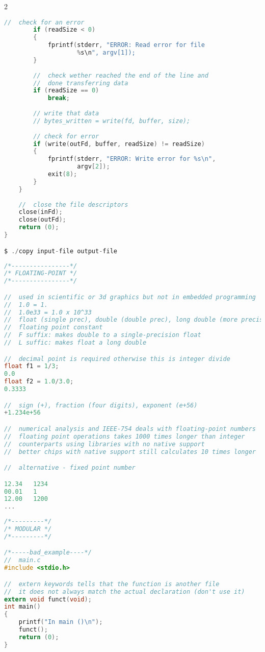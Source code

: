 \documentclass[8pt]{extarticle}
\begin{document}
\begin{small}
\begin{multicols}{2}
\begin{lstlisting}[language=C]
		//  check for an error
		if (readSize < 0)
		{
			fprintf(stderr, "ERROR: Read error for file 
					%s\n", argv[1]);
		}
		
		//  check wether reached the end of the line and
		//  done transferring data
		if (readSize == 0)
			break;
			
		// write that data
		// bytes_written = write(fd, buffer, size);
		
		// check for error
		if (write(outFd, buffer, readSize) != readSize)
		{
			fprintf(stderr, "ERROR: Write error for %s\n", 
					argv[2]);
			exit(8);
		}
	}
	
	//  close the file descriptors
	close(inFd);
	close(outFd);
	return (0);
}

$ ./copy input-file output-file
\end{lstlisting}

\begin{lstlisting}[language=C]
/*----------------*/
/* FLOATING-POINT */
/*----------------*/

//  used in scientific or 3d graphics but not in embedded programming
//  1.0 = 1.
//  1.0e33 = 1.0 x 10^33
//  float (single prec), double (double prec), long double (more precise)
//  floating point constant
//  F suffix: makes double to a single-precision float
//  L suffic: makes float a long double

//  decimal point is required otherwise this is integer divide
float f1 = 1/3;
0.0
float f2 = 1.0/3.0;
0.3333

//  sign (+), fraction (four digits), exponent (e+56)
+1.234e+56

//  numerical analysis and IEEE-754 deals with floating-point numbers
//  floating point operations takes 1000 times longer than integer 
//	counterparts using libraries with no native support
//	better chips with native support still calculates 10 times longer

//  alternative - fixed point number

12.34	1234
00.01	1
12.00	1200
...
\end{lstlisting}

\begin{lstlisting}[language=C]
/*---------*/
/* MODULAR */
/*---------*/

/*-----bad_example----*/
//  main.c
#include <stdio.h>

//  extern keywords tells that the function is another file
//  it does not always match the actual declaration (don't use it)
extern void funct(void);
int main()
{
	printf("In main ()\n");
	funct();
	return (0);
}


\end{lstlisting}
\end{multicols}
\end{small}
\end{document}
